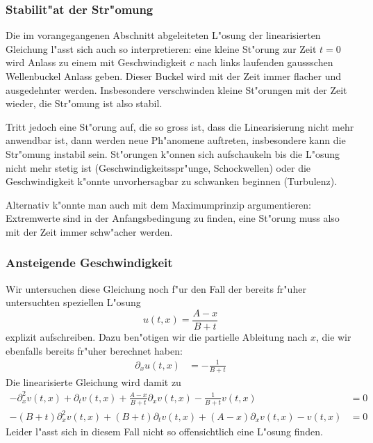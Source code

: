 \subsubsection{Stabilit"at der Str"omung}
Die im vorangegangenen Abschnitt abgeleiteten L"osung der linearisierten
Gleichung l"asst sich auch so interpretieren: eine kleine St"orung zur Zeit
$t=0$ wird Anlass zu einem mit Geschwindigkeit $c$ nach links
laufenden gaussschen Wellenbuckel Anlass geben. Dieser Buckel wird mit
der Zeit immer flacher und ausgedehnter werden. Insbesondere verschwinden
kleine St"orungen mit der Zeit wieder, die Str"omung ist also stabil.

Tritt jedoch eine St"orung auf, die so gross ist, dass die Linearisierung
nicht mehr anwendbar ist, dann werden neue Ph"anomene auftreten, insbesondere kann
die Str"omung instabil sein. St"orungen k"onnen sich aufschaukeln bis die
L"osung nicht mehr stetig ist (Geschwindigkeitsspr"unge, Schockwellen)
oder die Geschwindigkeit k"onnte unvorhersagbar zu schwanken beginnen
(Turbulenz).

Alternativ k"onnte man auch mit dem Maximumprinzip argumentieren: Extremwerte
sind in der Anfangsbedingung zu finden, eine St"orung muss also mit der
Zeit immer schw"acher werden.

\subsubsection{Ansteigende Geschwindigkeit}
Wir untersuchen diese Gleichung noch f"ur den Fall der bereits 
fr"uher untersuchten speziellen L"osung 
$$u(t,x)=\frac{A-x}{B+t}$$
explizit aufschreiben. Dazu ben"otigen wir die partielle Ableitung
nach $x$, die wir ebenfalls bereits fr"uher berechnet haben:
\begin{align*}
\partial_x u(t,x)&=-\frac{1}{B+t}
\end{align*}
Die linearisierte Gleichung wird damit zu
\begin{align*}
-\partial_x^2v(t,x)
+\partial_tv(t,x)
+ \frac{A-x}{B+t}\partial_xv(t,x)
-\frac{1}{B+t} v(t,x)
&=0
\\
-(B+t)\partial_x^2v(t,x)
+(B+t)\partial_tv(t,x)
+ (A-x)\partial_xv(t,x)
- v(t,x)
&=0
\end{align*}
Leider l"asst sich in diesem Fall nicht so offensichtlich eine L"osung finden.

